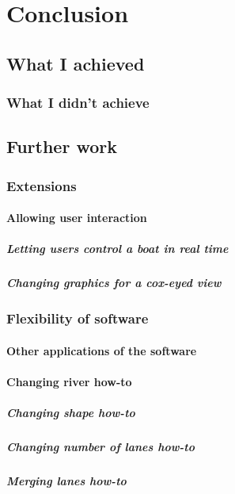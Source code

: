 \chapter{Conclusion}
  \section{What I achieved}
    \subsection{What I didn't achieve}
    
  \section{Further work}
    \subsection{Extensions}
      \subsubsection{Allowing user interaction}
        \paragraph{Letting users control a boat in real time}
        \paragraph{Changing graphics for a cox-eyed view}
    \subsection{Flexibility of software}
      \subsubsection{Other applications of the software}
      \subsubsection{Changing river how-to}
        \paragraph{Changing shape how-to}
        \paragraph{Changing number of lanes how-to}
        \paragraph{Merging lanes how-to}